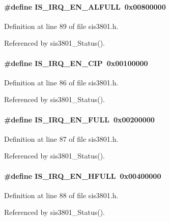 \paragraph[{IS\_\-IRQ\_\-EN\_\-ALFULL}]{\setlength{\rightskip}{0pt plus 5cm}\#define IS\_\-IRQ\_\-EN\_\-ALFULL~0x00800000}\hfill\label{sis3801_8h_aa95a908543d60c66e1945b3a7665bb5d}


Definition at line 89 of file sis3801.h.

Referenced by sis3801\_\-Status().
\paragraph[{IS\_\-IRQ\_\-EN\_\-CIP}]{\setlength{\rightskip}{0pt plus 5cm}\#define IS\_\-IRQ\_\-EN\_\-CIP~0x00100000}\hfill\label{sis3801_8h_a1fb13901dbd78f6dac8c801006561e69}


Definition at line 86 of file sis3801.h.

Referenced by sis3801\_\-Status().
\paragraph[{IS\_\-IRQ\_\-EN\_\-FULL}]{\setlength{\rightskip}{0pt plus 5cm}\#define IS\_\-IRQ\_\-EN\_\-FULL~0x00200000}\hfill\label{sis3801_8h_a620cc95bcfc979816f4fc113fd4b6352}


Definition at line 87 of file sis3801.h.

Referenced by sis3801\_\-Status().
\paragraph[{IS\_\-IRQ\_\-EN\_\-HFULL}]{\setlength{\rightskip}{0pt plus 5cm}\#define IS\_\-IRQ\_\-EN\_\-HFULL~0x00400000}\hfill\label{sis3801_8h_a9f8ac5b29fcad627da3c6ab413ce45d9}


Definition at line 88 of file sis3801.h.

Referenced by sis3801\_\-Status().
